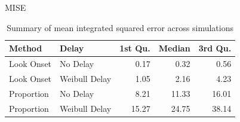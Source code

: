 \documentclass{beamer}
\begin{document}
\begin{frame}{MISE}

\begin{table}[H]
\centering
\begin{tabular}{llrrr}
  \hline
Method & Delay & 1st Qu. & Median & 3rd Qu. \\ 
  \hline
Look Onset & No Delay & 0.17 & 0.32 & 0.56 \\ 
  Look Onset & Weibull Delay & 1.05 & 2.16 & 4.23 \\ 
  Proportion & No Delay & 8.21 & 11.33 & 16.01 \\ 
  Proportion & Weibull Delay & 15.27 & 24.75 & 38.14 \\ 
   \hline
\end{tabular}
\caption{Summary of mean integrated squared error across simulations}
\label{tab:mise_sims}
\end{table}

\end{frame}
\end{document}
